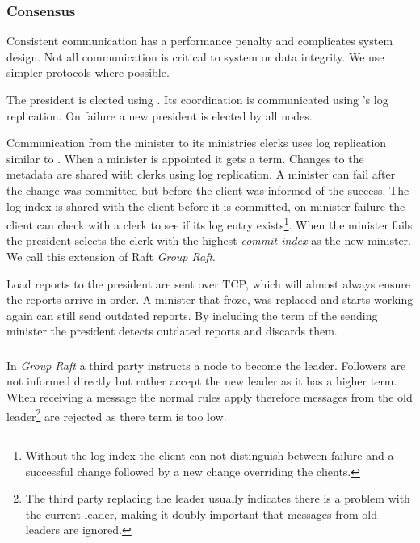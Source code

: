 \subsubsection*{Consensus} \label{sec:concensus} \label{sec:praft}
Consistent communication has a performance penalty and complicates system design. Not all communication is critical to system or data integrity. We use simpler protocols where possible. 

The president is elected using \raft{}. Its coordination is communicated using \raft{}'s log replication. On failure a new president is elected by all nodes.

Communication from the minister to its ministries clerks uses log replication similar to \raft{}. When a minister is appointed it gets a \raft{} term. Changes to the metadata are shared with clerks using log replication. A minister can fail after the change was committed but before the client was informed of the success. The log index is shared with the client before it is committed, on minister failure the client can check with a clerk to see if its log entry exists\footnote{Without the log index the client can not distinguish between failure and a successful change followed by a new change overriding the clients.}. When the minister fails the president selects the clerk with the highest \textsl{commit index} as the new minister. We call this extension of Raft \textit{Group Raft}.

Load reports to the president are sent over TCP, which will almost always ensure the reports arrive in order. A minister that froze, was replaced and starts working again can still send outdated reports. By including the term of the sending minister the president detects outdated reports and discards them.
%
\subsubsection*{\graft{}} \label{sec:dictraft}
In \textit{Group Raft} a third party instructs a node to become the leader. Followers are not informed directly but rather accept the new leader as it has a higher term. When receiving a message the normal \raft{} rules apply therefore messages from the old leader\footnote{The third party replacing the leader usually indicates there is a problem with the current leader, making it doubly important that messages from old leaders are ignored.} are rejected as there term is too low.


